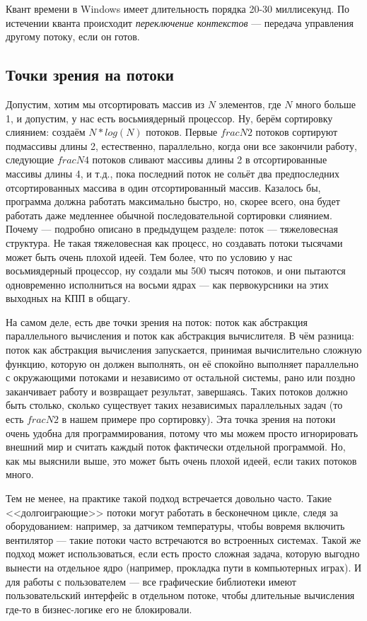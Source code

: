 \documentclass[a5paper]{article}
\begin{document}
Квант времени в Windows имеет длительность порядка 20-30 миллисекунд. По истечении кванта происходит \textit{переключение контекстов} --- передача управления другому потоку, если он готов.

\subsection{Точки зрения на потоки}

Допустим, хотим мы отсортировать массив из $N$ элементов, где $N$ много больше 1, и допустим, у нас есть восьмиядерный процессор. Ну, берём сортировку слиянием: создаём $N * log(N)$ потоков. Первые $frac{N}{2}$ потоков сортируют подмассивы длины 2, естественно, параллельно, когда они все закончили работу, следующие $frac{N}{4}$ потоков сливают массивы длины 2 в отсортированные массивы длины 4, и т.д., пока последний поток не сольёт два предпоследних отсортированных массива в один отсортированный массив. Казалось бы, программа должна работать максимально быстро, но, скорее всего, она будет работать даже медленнее обычной последовательной сортировки слиянием. Почему --- подробно описано в предыдущем разделе: поток --- тяжеловесная структура. Не такая тяжеловесная как процесс, но создавать потоки тысячами может быть очень плохой идеей. Тем более, что по условию у нас восьмиядерный процессор, ну создали мы 500 тысяч потоков, и они пытаются одновременно исполниться на восьми ядрах --- как первокурсники на этих выходных на КПП в общагу.

На самом деле, есть две точки зрения на поток: поток как абстракция параллельного вычисления и поток как абстракция вычислителя. В чём разница: поток как абстракция вычисления запускается, принимая вычислительно сложную функцию, которую он должен выполнять, он её спокойно выполняет параллельно с окружающими потоками и независимо от остальной системы, рано или поздно заканчивает работу и возвращает результат, завершаясь. Таких потоков должно быть столько, сколько существует таких независимых параллельных задач (то есть $frac{N}{2}$ в нашем примере про сортировку). Эта точка зрения на потоки очень удобна для программирования, потому что мы можем просто игнорировать внешний мир и считать каждый поток фактически отдельной программой. Но, как мы выяснили выше, это может быть очень плохой идеей, если таких потоков много. 

Тем не менее, на практике такой подход встречается довольно часто. Такие <<долгоиграющие>> потоки могут работать в бесконечном цикле, следя за оборудованием: например, за датчиком температуры, чтобы вовремя включить вентилятор --- такие потоки часто встречаются во встроенных системах. Такой же подход может использоваться, если есть просто сложная задача, которую выгодно вынести на отдельное ядро (например, прокладка пути в компьютерных играх). И для работы с пользователем --- все графические библиотеки имеют пользовательский интерфейс в отдельном потоке, чтобы длительные вычисления где-то в бизнес-логике его не блокировали.
\end{document}
